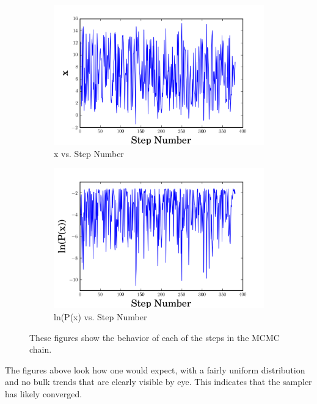 \documentclass[english,12pt]{article}
\begin{document}
\begin{figure}[H]
\centering
\begin{subfigure}{.5\textwidth}
  \centering
  \includegraphics[width=\linewidth]{step_vs_x_mcmc.png}
  \caption{x vs. Step Number}
  \label{fig:sub1y}
\end{subfigure}%
\begin{subfigure}{0.5\textwidth}
  \centering
  \includegraphics[width=\linewidth]{lnp_step_number_mcmc.png}
  \caption{ln(P(x) vs. Step Number}
  \label{fig:sub2y}
\end{subfigure}
\caption{These figures show the behavior of each of the steps in the MCMC chain.}
\label{fig:testy}
\end{figure}

The figures above look how one would expect, with a fairly uniform distribution and no bulk trends that are clearly visible by eye. This indicates that the sampler has likely converged.
\end{document}
